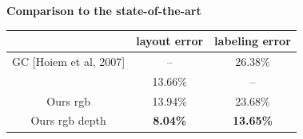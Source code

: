 \documentclass[a0paper,landscape,final]{baposter}
\begin{document}
\begin{poster}
{\vspace{-0.15cm}
{\bf Comparison to the state-of-the-art}
\begin{table}[H]
\vspace{-0.3cm}
\centering
\begin{tabular}{|c||c|c|}
\hline
& layout error & labeling error\\ \hline
GC [Hoiem et al, 2007] &  -- & 26.38\% \\
\hline
[Schwing et al., 2012] & 13.66\% & -- \\ \hline
Ours rgb & 13.94\% & 23.68\% \\
\hline
Ours rgb depth& {\bf 8.04\%} & {\bf 13.65\%} \\
\hline
\end{tabular}
\end{table}

}
\end{poster}
\end{document}
